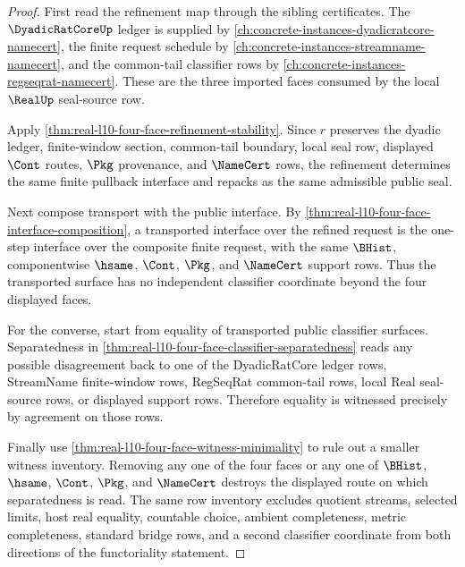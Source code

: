 \begin{proof}
First read the refinement map through the sibling certificates. The $\DyadicRatCoreUp$ ledger is supplied by \autoref{ch:concrete-instances-dyadicratcore-namecert}, the finite request schedule by \autoref{ch:concrete-instances-streamname-namecert}, and the common-tail classifier rows by \autoref{ch:concrete-instances-regseqrat-namecert}. These are the three imported faces consumed by the local $\RealUp$ seal-source row.

Apply \autoref{thm:real-l10-four-face-refinement-stability}. Since $r$ preserves the dyadic ledger, finite-window section, common-tail boundary, local seal row, displayed $\Cont$ routes, $\Pkg$ provenance, and $\NameCert$ rows, the refinement determines the same finite pullback interface and repacks as the same admissible public seal.

Next compose transport with the public interface. By \autoref{thm:real-l10-four-face-interface-composition}, a transported interface over the refined request is the one-step interface over the composite finite request, with the same $\BHist$, componentwise $\hsame$, $\Cont$, $\Pkg$, and $\NameCert$ support rows. Thus the transported surface has no independent classifier coordinate beyond the four displayed faces.

For the converse, start from equality of transported public classifier surfaces. Separatedness in \autoref{thm:real-l10-four-face-classifier-separatedness} reads any possible disagreement back to one of the DyadicRatCore ledger rows, StreamName finite-window rows, RegSeqRat common-tail rows, local Real seal-source rows, or displayed support rows. Therefore equality is witnessed precisely by agreement on those rows.

Finally use \autoref{thm:real-l10-four-face-witness-minimality} to rule out a smaller witness inventory. Removing any one of the four faces or any one of $\BHist$, $\hsame$, $\Cont$, $\Pkg$, and $\NameCert$ destroys the displayed route on which separatedness is read. The same row inventory excludes quotient streams, selected limits, host real equality, countable choice, ambient completeness, metric completeness, standard bridge rows, and a second classifier coordinate from both directions of the functoriality statement.
\end{proof}

